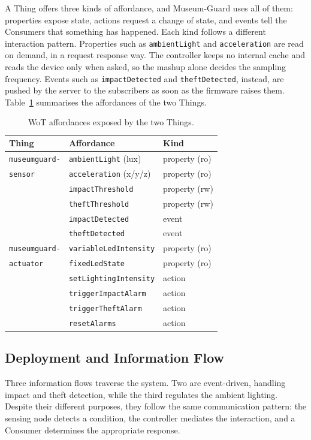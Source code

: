 \documentclass[conference]{IEEEtran}
\begin{document}
A Thing offers three kinds of affordance, and Museum-Guard uses all of them: properties expose state, actions request a change of state, and events tell the Consumers that something has happened. Each kind follows a different interaction pattern. Properties such as \texttt{ambientLight} and \texttt{acceleration} are read on demand, in a request response way. The controller keeps no internal cache and reads the device only when asked, so the mashup alone decides the sampling frequency. Events such as \texttt{impactDetected} and \texttt{theftDetected}, instead, are pushed by the server to the subscribers as soon as the firmware raises them. Table~\ref{tab:things} summarises the affordances of the two Things.

\begin{table}[htbp]
\caption{WoT affordances exposed by the two Things.}
\label{tab:things}
\centering
\footnotesize
\begin{tabular}{@{}lll@{}}
\toprule
\textbf{Thing} & \textbf{Affordance} & \textbf{Kind} \\
\midrule
\texttt{museumguard-} & \texttt{ambientLight} (lux) & property (ro) \\
\texttt{sensor}       & \texttt{acceleration} (x/y/z) & property (ro) \\
& \texttt{impactThreshold} & property (rw) \\
& \texttt{theftThreshold} & property (rw) \\
& \texttt{impactDetected} & event \\
& \texttt{theftDetected} & event \\
\midrule
\texttt{museumguard-} & \texttt{variableLedIntensity} & property (ro) \\
\texttt{actuator}     & \texttt{fixedLedState} & property (ro) \\
& \texttt{setLightingIntensity} & action \\
& \texttt{triggerImpactAlarm} & action \\
& \texttt{triggerTheftAlarm} & action \\
& \texttt{resetAlarms} & action \\
\bottomrule
\end{tabular}
\end{table}

\subsection{Deployment and Information Flow}
Three information flows traverse the system. Two are event-driven, handling impact and theft detection, while the third regulates the ambient lighting. Despite their different purposes, they follow the same communication pattern: the sensing node detects a condition, the controller mediates the interaction, and a Consumer determines the appropriate response.
\end{document}
